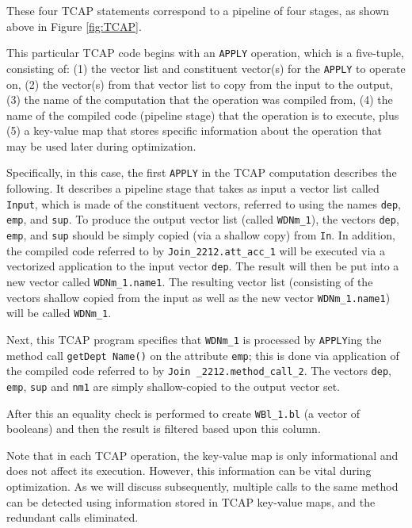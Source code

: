 \noindent
These four TCAP statements correspond to a pipeline of four stages,
as shown above in Figure \ref{fig:TCAP}.

This particular TCAP code begins with an \texttt{APPLY} operation, which is a five-tuple, consisting of: (1) the vector list and constituent
vector(s) for the \texttt{APPLY} to operate on, (2) the vector(s) from that vector list to copy
from the input to the output, (3) the name of the computation that the operation was compiled from, (4) the name of the compiled code (pipeline stage)
that the operation is to execute, plus (5) a key-value map that stores specific information about the operation that may be used 
later during optimization.

Specifically, in this case, the first \texttt{APPLY} in the TCAP computation describes the following.  It describes a pipeline stage that
takes as input 
a vector list called \texttt{Input}, which is made of the constituent vectors, referred to using 
the names \texttt{dep}, \texttt{emp}, and \texttt{sup}.
To produce the output vector list (called \texttt{WDNm\_1}), the vectors
\texttt{dep}, \texttt{emp}, and \texttt{sup} should be simply copied (via a shallow copy) from \texttt{In}.
In addition, the compiled code referred to by \texttt{Join\_2212.att\_acc\_1} will be executed via a vectorized application to the input
vector \texttt{dep}.  The result will then be put into a new vector called 
\texttt{WDNm\_1.name1}.
The resulting vector list (consisting of the vectors shallow copied from the input as well as the new vector \texttt{WDNm\_1.name1})
will be called \texttt{WDNm\_1}.  

Next, this TCAP program
specifies that \texttt{WDNm\_1} is processed by \texttt{APPLY}ing the
method call \texttt{getDept Name()} on the attribute \texttt{emp}; this is 
done via application of the compiled code referred to by \texttt{Join
  \_2212.method\_call\_2}.  
The vectors \texttt{dep}, \texttt{emp}, \texttt{sup}
and \texttt{nm1} are simply shallow-copied to the output vector set.

After this an equality check is performed to create \texttt{WBl\_1.bl}
(a vector of booleans) and then the result is filtered based upon this
column.


Note that in each TCAP operation, the key-value map is only informational and does not affect its execution.  However, this
information can be vital during optimization.  As we will discuss subsequently, 
multiple calls to the same method can be detected using information stored in TCAP key-value maps, and the redundant calls eliminated.

